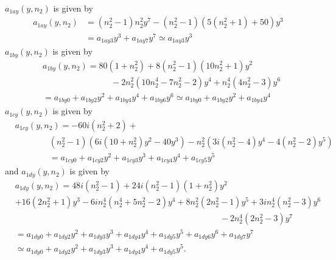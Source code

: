 \documentclass[aps,preprint]{revtex4}%
\begin{document}
$a_{1ay}\left(  y,n_{2}\right)  $ is given by%
\begin{align}
a_{1ay}\left(  y,n_{2}\right)   &  =\left(  n_{2}^{2}-1\right)  n_{2}^{2}%
y^{7}-\left(  n_{2}^{2}-1\right)  \left(  5\left(  n_{2}^{2}+1\right)
+50\right)  y^{3}\nonumber\\
&  =a_{1ay3}y^{3}+a_{1ay7}y^{7}\simeq a_{1ay3}y^{3}%
\end{align}
$a_{1by}\left(  y,n_{2}\right)  $ is given by%
\begin{align}
&  a_{1by}\left(  y,n_{2}\right)  =80\left(  1+n_{2}^{2}\right)  +8\left(
n_{2}^{2}-1\right)  \left(  10n_{2}^{2}+1\right)  y^{2}\nonumber\\
&  \qquad\qquad\qquad\qquad-2n_{2}^{2}\left(  10n_{2}^{4}-7n_{2}^{2}-2\right)
y^{4}+n_{2}^{4}\left(  4n_{2}^{2}-3\right)  y^{6}\nonumber\\
&  =a_{1by0}+a_{1by2}y^{2}+a_{1by4}y^{4}+a_{1by6}y^{6}\simeq a_{1by0}%
+a_{1by2}y^{2}+a_{1by4}y^{4}%
\end{align}
$a_{1cy}\left(  y,n_{2}\right)  $ is given by%
\begin{align}
&  a_{1cy}\left(  y,n_{2}\right)  =-60i\left(  n_{2}^{2}+2\right)
+\nonumber\\
&  \qquad\qquad\left(  n_{2}^{2}-1\right)  \left(  6i\left(  10+n_{2}%
^{2}\right)  y^{2}-40y^{3}\right)  -n_{2}^{2}\left(  3i\left(  n_{2}%
^{2}-4\right)  y^{4}-4\left(  n_{2}^{2}-2\right)  y^{5}\right) \nonumber\\
&  \left.  \qquad\qquad\right.  =a_{1cy0}+a_{1cy2}y^{2}+a_{1cy3}y^{3}%
+a_{1cy4}y^{4}+a_{1cy5}y^{5}%
\end{align}
and $a_{1dy}\left(  y,n_{2}\right)  $ is given by%
\begin{align}
&  a_{1dy}\left(  y,n_{2}\right)  =48i\left(  n_{2}^{2}-1\right)  +24i\left(
n_{2}^{2}-1\right)  \left(  1+n_{2}^{2}\right)  y^{2}\nonumber\\
&  +16\left(  2n_{2}^{2}+1\right)  y^{3}-6in_{2}^{4}\left(  n_{2}^{4}%
+5n_{2}^{2}-2\right)  y^{4}+8n_{2}^{2}\left(  2n_{2}^{2}-1\right)
y^{5}+3in_{2}^{4}\left(  n_{2}^{2}-3\right)  y^{6}\nonumber\\
&  \qquad\qquad\qquad\qquad\qquad\qquad\qquad\qquad\qquad\qquad\qquad
\qquad-2n_{2}^{4}\left(  2n_{2}^{2}-3\right)  y^{7}\nonumber\\
&  =a_{1dy0}+a_{1dy2}y^{2}+a_{1dy3}y^{3}+a_{1dy4}y^{4}+a_{1dy5}y^{5}%
+a_{1dy6}y^{6}+a_{1dy7}y^{7}\nonumber\\
&  \simeq a_{1dy0}+a_{1dy2}y^{2}+a_{1dy3}y^{3}+a_{1dy4}y^{4}+a_{1dy5}y^{5}.
\end{align}
\end{document}
